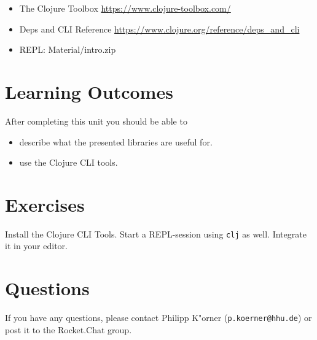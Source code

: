 \documentclass[11pt,a4paper]{article}
\begin{document}
	\begin{itemize}
        \item The Clojure Toolbox \url{https://www.clojure-toolbox.com/}
        \item Deps and CLI Reference \url{https://www.clojure.org/reference/deps_and_cli}
        \item REPL: Material/intro.zip
	\end{itemize}
	
	
	\section{Learning Outcomes}
	
	After completing this unit you should be able to
	
	\begin{itemize}
        \item describe what the presented libraries are useful for.
        \item use the Clojure CLI tools.
	\end{itemize}
	
	\section{Exercises}

	\begin{exercise}
		Install the Clojure CLI Tools.
		Start a REPL-session using \verb|clj| as well. Integrate it in your editor.
	\end{exercise}
	
	
	
	
    \enlargethispage{2\baselineskip}
	\section*{Questions}
	If you have any questions, please contact Philipp K"orner (\texttt{p.koerner@hhu.de}) or post it to the Rocket.Chat group.
\end{document}
